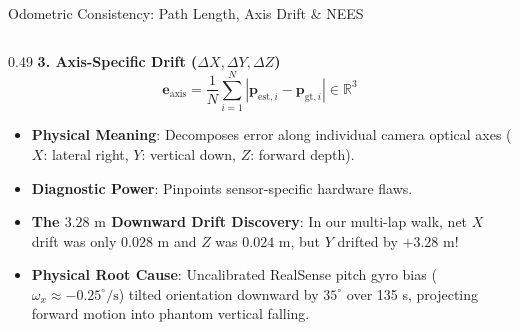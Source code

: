 \documentclass[aspectratio=169, 10pt]{beamer}
\begin{document}
\begin{frame}{Odometric Consistency: Path Length, Axis Drift \& NEES}
\begin{columns}[T]
    \begin{column}{0.49\textwidth}
      {\small \textbf{\textcolor{NavyBlue}{3. Axis-Specific Drift ($\Delta X, \Delta Y, \Delta Z$)}}}
      \begin{equation}
        \mathbf{e}_{\text{axis}} = \frac{1}{N} \sum_{i=1}^N \left| \mathbf{p}_{\text{est}, i} - \mathbf{p}_{\text{gt}, i} \right| \in \mathbb{R}^3
      \end{equation}
      \scriptsize
      \begin{itemize}
        \setlength{\itemsep}{1.5pt}
        \item \textbf{Physical Meaning}: Decomposes error along individual camera optical axes ($X$: lateral right, $Y$: vertical down, $Z$: forward depth).
        \item \textbf{Diagnostic Power}: Pinpoints sensor-specific hardware flaws.
        \item \textbf{The $3.28\text{ m}$ Downward Drift Discovery}: In our multi-lap walk, net $X$ drift was only $0.028\text{ m}$ and $Z$ was $0.024\text{ m}$, but $Y$ drifted by $+3.28\text{ m}$!
        \item \textbf{Physical Root Cause}: Uncalibrated RealSense pitch gyro bias ($\omega_x \approx -0.25^\circ/\text{s}$) tilted orientation downward by $35^\circ$ over 135 s, projecting forward motion into phantom vertical falling.
      \end{itemize}
    \end{column}
  \end{columns}
\end{frame}
\end{document}
